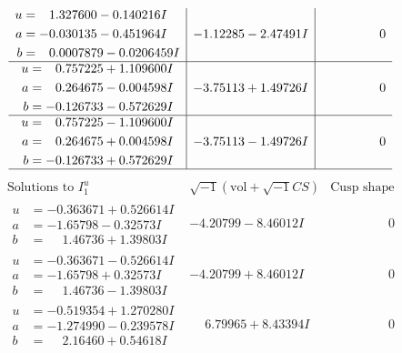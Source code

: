 \documentclass[1p]{elsarticle_modified}
\theoremstyle{definition}
\newcommand{\I}{\sqrt{-1}}
\begin{document}
$$\begin{array}{c|c|c}
\begin{aligned}
u &= \phantom{-}1.327600 - 0.140216 I \\
a &= -0.030135 - 0.451964 I \\
b &= \phantom{-}0.0007879 - 0.0206459 I\end{aligned}
 & -1.12285 - 2.47491 I & \phantom{-0.000000 } 0 \\ \hline\begin{aligned}
u &= \phantom{-}0.757225 + 1.109600 I \\
a &= \phantom{-}0.264675 - 0.004598 I \\
b &= -0.126733 - 0.572629 I\end{aligned}
 & -3.75113 + 1.49726 I & \phantom{-0.000000 } 0 \\ \hline\begin{aligned}
u &= \phantom{-}0.757225 - 1.109600 I \\
a &= \phantom{-}0.264675 + 0.004598 I \\
b &= -0.126733 + 0.572629 I\end{aligned}
 & -3.75113 - 1.49726 I & \phantom{-0.000000 } 0\\
 \hline 
 \end{array}$$\newpage$$\begin{array}{c|c|c}  
\text{Solutions to }I^u_{1}& \I (\text{vol} + \sqrt{-1}CS) & \text{Cusp shape}\\
 \hline 
\begin{aligned}
u &= -0.363671 + 0.526614 I \\
a &= -1.65798 - 0.32573 I \\
b &= \phantom{-}1.46736 + 1.39803 I\end{aligned}
 & -4.20799 - 8.46012 I & \phantom{-0.000000 } 0 \\ \hline\begin{aligned}
u &= -0.363671 - 0.526614 I \\
a &= -1.65798 + 0.32573 I \\
b &= \phantom{-}1.46736 - 1.39803 I\end{aligned}
 & -4.20799 + 8.46012 I & \phantom{-0.000000 } 0 \\ \hline\begin{aligned}
u &= -0.519354 + 1.270280 I \\
a &= -1.274990 - 0.239578 I \\
b &= \phantom{-}2.16460 + 0.54618 I\end{aligned}
 & \phantom{-}6.79965 + 8.43394 I & \phantom{-0.000000 } 0 \\ \hline\begin{aligned}

\end{aligned}
\end{array}$$
\end{document}
